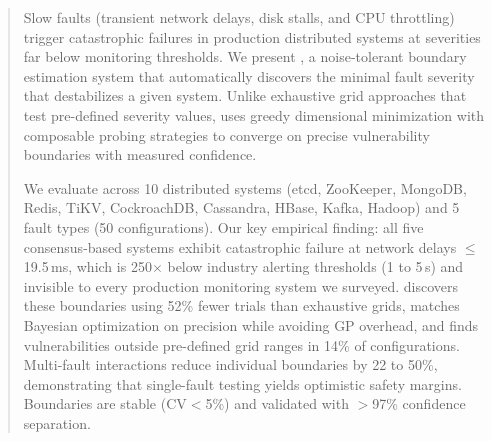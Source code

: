 \begin{abstract}
Slow faults (transient network delays, disk stalls, and CPU
throttling) trigger catastrophic failures in production distributed
systems at severities far below monitoring thresholds. We present
\system{}, a noise-tolerant boundary estimation system that automatically
discovers the minimal fault severity that destabilizes a given system. Unlike
exhaustive grid approaches that test pre-defined severity values, \system{}
uses greedy dimensional minimization with composable probing strategies to
converge on precise vulnerability boundaries with measured confidence.

We evaluate \system{} across 10 distributed systems (etcd, ZooKeeper,
MongoDB, Redis, TiKV, CockroachDB, Cassandra, HBase, Kafka, Hadoop) and
5 fault types (50 configurations). Our key empirical finding: all five
consensus-based systems exhibit catastrophic failure at network delays
$\leq$19.5\,ms, which is 250$\times$ below industry alerting thresholds (1 to 5\,s)
and invisible to every production monitoring system we surveyed. \system{}
discovers these boundaries using 52\% fewer trials than exhaustive grids,
matches Bayesian optimization on precision while avoiding GP overhead, and
finds vulnerabilities outside pre-defined grid ranges in 14\% of
configurations. Multi-fault interactions reduce individual boundaries
by 22 to 50\%, demonstrating that single-fault testing yields optimistic
safety margins. Boundaries are stable (CV$<$5\%) and validated with
$>$97\% confidence separation.
\end{abstract}
